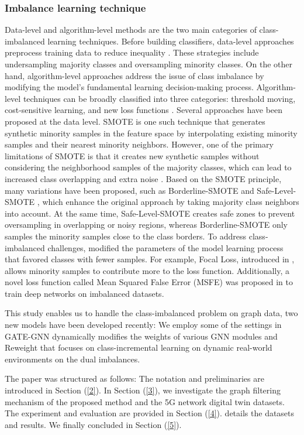 \subsubsection{Imbalance learning technique}
    Data-level and algorithm-level methods are the two main categories of class-imbalanced learning techniques. Before building classifiers, data-level approaches preprocess training data to reduce inequality \cite{li2021novel}. These strategies include undersampling majority classes and oversampling minority classes. On the other hand, algorithm-level approaches address the issue of class imbalance by modifying the model's fundamental learning decision-making process. Algorithm-level techniques can be broadly classified into three categories: threshold moving, cost-sensitive learning, and new loss functions \cite{johnson2019survey}. Several approaches have been proposed at the data level. SMOTE \cite{chawla2002smote} is one such technique that generates synthetic minority samples in the feature space by interpolating existing minority samples and their nearest minority neighbors. However, one of the primary limitations of SMOTE is that it creates new synthetic samples without considering the neighborhood samples of the majority classes, which can lead to increased class overlapping and extra noise \cite{koziarski2019radial}. Based on the SMOTE principle, many variations have been proposed, such as Borderline-SMOTE \cite{han2005borderline} and Safe-Level-SMOTE \cite{bunkhumpornpat2009safe}, which enhance the original approach by taking majority class neighbors into account. At the same time, Safe-Level-SMOTE creates safe zones to prevent oversampling in overlapping or noisy regions, whereas Borderline-SMOTE only samples the minority samples close to the class borders. To address class-imbalanced challenges, \cite{gilmer2017neural} modified the parameters of the model learning process that favored classes with fewer samples. For example, Focal Loss, introduced in \cite{lin2017focal}, allows minority samples to contribute more to the loss function. Additionally, a novel loss function called Mean Squared False Error (MSFE) was proposed in \cite{wang2016training} to train deep networks on imbalanced datasets.
    
    This study enables us to handle the class-imbalanced problem on graph data, two new models have been developed recently: We employ some of the settings in GATE-GNN \cite{fofanah2024addressing} dynamically modifies the weights of various GNN modules and Reweight \cite{he2024gradient} that focuses on class-incremental learning on dynamic real-world environments on the dual imbalances.

The paper was structured as follows: The notation and preliminaries are introduced in Section (\ref{2}). In Section (\ref{3}), we investigate the graph filtering mechanism of the proposed method and the 5G network digital twin datasets. The experiment and evaluation are provided in Section (\ref{4}). details the datasets and results. We finally concluded in Section (\ref{5}).